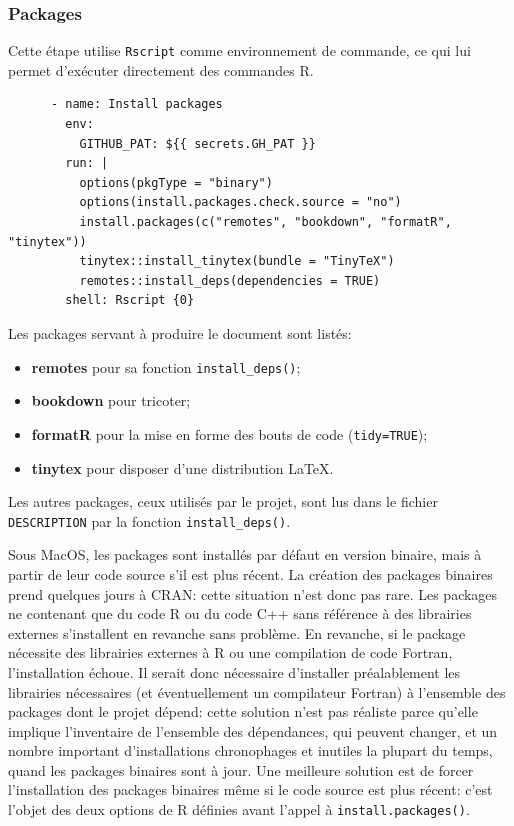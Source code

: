 \documentclass[
  12pt,
  french,
  a4paper,
  extrafontsizes,onecolumn,openright
  ]{memoir}
\providecommand{\tightlist}{%
  \setlength{\itemsep}{0pt}\setlength{\parskip}{0pt}}
\begin{document}
\subsubsection{Packages}\label{sec:packages-ci}

Cette étape utilise \texttt{Rscript} comme environnement de commande, ce qui lui permet d'exécuter directement des commandes R.

\begin{verbatim}
      - name: Install packages
        env:
          GITHUB_PAT: ${{ secrets.GH_PAT }}
        run: |
          options(pkgType = "binary")
          options(install.packages.check.source = "no")
          install.packages(c("remotes", "bookdown", "formatR", "tinytex"))
          tinytex::install_tinytex(bundle = "TinyTeX")
          remotes::install_deps(dependencies = TRUE)
        shell: Rscript {0}
\end{verbatim}

Les packages servant à produire le document sont listés:

\begin{itemize}
\tightlist
\item
  \textbf{remotes} pour sa fonction \texttt{install\_deps()};
\item
  \textbf{bookdown} pour tricoter;
\item
  \textbf{formatR} pour la mise en forme des bouts de code (\texttt{tidy=TRUE});
\item
  \textbf{tinytex} pour disposer d'une distribution LaTeX.
\end{itemize}

Les autres packages, ceux utilisés par le projet, sont lus dans le fichier \texttt{DESCRIPTION} par la fonction \texttt{install\_deps()}.

Sous MacOS, les packages sont installés par défaut en version binaire, mais à partir de leur code source s'il est plus récent.
La création des packages binaires prend quelques jours à CRAN: cette situation n'est donc pas rare.
Les packages ne contenant que du code R ou du code C++ sans référence à des librairies externes s'installent en revanche sans problème.
En revanche, si le package nécessite des librairies externes à R ou une compilation de code Fortran, l'installation échoue.
Il serait donc nécessaire d'installer préalablement les librairies nécessaires (et éventuellement un compilateur Fortran) à l'ensemble des packages dont le projet dépend: cette solution n'est pas réaliste parce qu'elle implique l'inventaire de l'ensemble des dépendances, qui peuvent changer, et un nombre important d'installations chronophages et inutiles la plupart du temps, quand les packages binaires sont à jour.
Une meilleure solution est de forcer l'installation des packages binaires même si le code source est plus récent: c'est l'objet des deux options de R définies avant l'appel à \texttt{install.packages()}.
\end{document}
